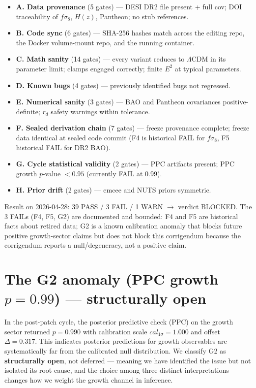 \documentclass[11pt]{article}
\begin{document}
\begin{itemize}[leftmargin=*]
\item \textbf{A. Data provenance} (5 gates) --- DESI DR2 file present + full cov; DOI traceability of $f\sigma_8$, $H(z)$, Pantheon; no stub references.
\item \textbf{B. Code sync} (6 gates) --- SHA-256 hashes match across the editing repo, the Docker volume-mount repo, and the running container.
\item \textbf{C. Math sanity} (14 gates) --- every variant reduces to $\Lambda$CDM in its parameter limit; clamps engaged correctly; finite $E^2$ at typical parameters.
\item \textbf{D. Known bugs} (4 gates) --- previously identified bugs not regressed.
\item \textbf{E. Numerical sanity} (3 gates) --- BAO and Pantheon covariances positive-definite; $r_d$ safety warnings within tolerance.
\item \textbf{F. Sealed derivation chain} (7 gates) --- freeze provenance complete; freeze data identical at sealed code commit (F4 is historical FAIL for $f\sigma_8$, F5 historical FAIL for DR2 BAO).
\item \textbf{G. Cycle statistical validity} (2 gates) --- PPC artifacts present; PPC growth $p$-value $<0.95$ (currently FAIL at 0.99).
\item \textbf{H. Prior drift} (2 gates) --- emcee and NUTS priors symmetric.
\end{itemize}

Result on 2026-04-28: 39 PASS / 3 FAIL / 1 WARN $\to$ verdict BLOCKED. The
3 FAILs (F4, F5, G2) are documented and bounded: F4 and F5 are historical
facts about retired data; G2 is a known calibration anomaly that blocks
future positive growth-sector claims but does not block this corrigendum
because the corrigendum reports a null/degeneracy, not a positive claim.

\section{The G2 anomaly (PPC growth $p=0.99$) --- structurally open}
\label{sec:g2}

In the post-patch cycle, the posterior predictive check (PPC) on the
growth sector returned $p=0.990$ with calibration scale
$cal_{1\sigma}=1.000$ and offset $\Delta=0.317$. This indicates posterior
predictions for growth observables are systematically far from the
calibrated null distribution. We classify G2 as
\textbf{structurally open}, not deferred --- meaning we have identified the
issue but not isolated its root cause, and the choice among three
distinct interpretations changes how we weight the growth channel in
inference.
\end{document}
